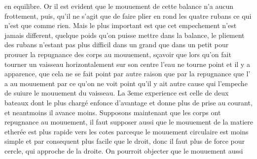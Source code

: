 en equilibre. Or il est evident que le mouuement de cette balance\protect{}
n'a aucun frottement\protect{}, puis,
qu'il ne s'agit que de faire plier en rond les quatre rubans\protect{} ce qui n'est que comme rien. Mais le plus
important est que cet empechement n'est jamais different, quelque poids qu'on puisse mettre dans la balance,\protect{}
le pliement des rubans\protect{} n'estant pas plus difficil dans un grand que dans un petit
pour prouuer la repugnance des corps au mouuement, s\c{c}avoir que lors qu'on fait tourner un
vaisseau\protect{} horizontalement sur son centre l'eau\protect{} ne tourne point et il y a apparence, que cela ne se fait point par autre raison que par la repugnance que l' a au mouuement par ce qu'on ne voit point qu'il y ait
autre cause qui l'empeche de suiure le mouuement du vaisseau\protect{}.%
%
%
%
%
%
\pend%
\pstart%
La 3eme%
experience\protect{} est celle de deux bateaux
dont le plus charg\'{e} enfonce d'avantage et donne plus de prise au courant, et neantmoins il avance moins.
\pend%
\pstart%
Supposons maintenant que les corps ont repugnance\protect{} au mouuement, il faut supposer aussi que
le mouuement de la matiere ether\'{e}e est plus rapide vers les cotes parceque le mouuement circulaire est moins
simple et par consequent plus facile que le droit, donc il faut plus de force pour
  cercle, 
 qui approche de la droite. On pourroit objecter que le mouuement aussi
